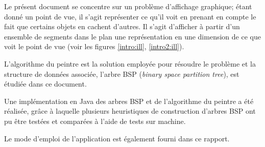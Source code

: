 Le présent document se concentre sur un problème d'affichage graphique;
étant donné un point de vue, il s'agit représenter ce qu'il voit en
prenant en compte le fait que certains objets en cachent d'autres.
Il s'agit d'afficher à partir d'un ensemble de segments dans le
plan une représentation en une dimension de ce que voit le point de vue
(voir les figures
\ref{intro:ill}, \ref{intro2:ill}).

L'algorithme du peintre est la solution employée pour résoudre le problème et
la structure de données associée, l'arbre BSP
(\emph{binary space partition tree}), est étudiée dans ce document.

Une implémentation en Java des arbres BSP et de l'algorithme
du peintre a été réalisée, grâce à laquelle plusieurs
heuristiques de construction d'arbres BSP ont pu être testées et
comparées à l'aide de tests sur machine.

Le mode d'emploi de l'application est également fourni dans ce rapport.



